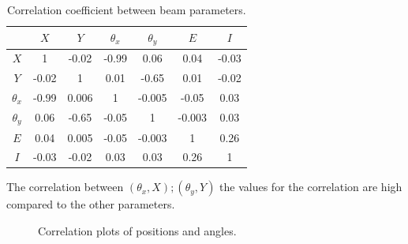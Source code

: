 \begin{table}[!h]
\centering
\begin{tabular}{c|cccccc}
\hline 
             & $X$ & $Y$ & $\theta_{x}$ & $\theta_{y}$ & $E$ & $I$\\ 
\hline 
$X$            & 1 & -0.02 & -0.99 & 0.06 & 0.04  & -0.03\\ 

$Y$            & -0.02 & 1 & 0.01 & -0.65 & 0.01  & -0.02\\ 

$\theta_{x}$ & -0.99 & 0.006 & 1  & -0.005 & -0.05 & 0.03\\ 

$\theta_{y}$ & 0.06 & -0.65 & -0.05 & 1 & -0.003  & 0.03\\ 
 
$E$            & 0.04 & 0.005 & -0.05  & -0.003  & 1 & 0.26\\ 
 
$I$            & -0.03 & -0.02 & 0.03  & 0.03 & 0.26 & 1\\ 
\hline
\end{tabular}
\caption{Correlation coefficient between beam parameters.}
\label{tab:CorrMatrix} 
\end{table}

The correlation between $(\theta_{x},X);(\theta_{y},Y)$ the values for the correlation are high compared to the other parameters. 

\begin{figure}[ht]
\centering
{}
\caption{Correlation plots of positions and angles.}
\label{fig:CorrelationBeam}
\end{figure}

